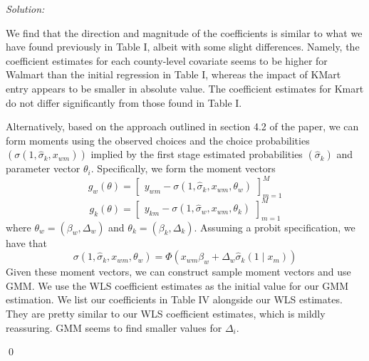 \documentclass[12pt]{article}
\newenvironment{sol}
    {\emph{Solution:}
    }
    {
    \qed
    }
\begin{document}
\begin{sol}
  We find that the direction and magnitude of the coefficients is similar to what we have found previously in Table I, albeit with some slight differences. Namely, the coefficient estimates for each county-level covariate seems to be higher for Walmart than the initial regression in Table I, whereas the impact of KMart entry appears to be smaller in absolute value. The coefficient estimates for Kmart do not differ significantly from those found in Table I.


  Alternatively, based on the approach outlined in section 4.2 of the paper, we can form moments using the observed choices and the choice probabilities $(\sigma(1, \hat{\sigma}_k, x_{wm}))$ implied by the first stage estimated probabilities $(\hat{\sigma}_k)$ and parameter vector $\theta_i$. Specifically, we form the moment vectors
  \[g_w(\theta) = \begin{bmatrix} y_{wm} - \sigma(1, \hat{\sigma}_k, x_{wm}, \theta_w) \end{bmatrix}_{m=1}^M \]
  \[g_k(\theta) = \begin{bmatrix} y_{km} - \sigma(1, \hat{\sigma}_w, x_{wm}, \theta_k) \end{bmatrix}_{m=1}^M \]
  where $\theta_w = (\beta_w, \Delta_w)$ and $\theta_k = (\beta_k, \Delta_k)$. Assuming a probit specification, we have that 
  \[ \sigma(1, \hat{\sigma}_k, x_{wm}, \theta_w) = \Phi(x_{wm}\beta_w + \Delta_w \hat{\sigma}_k(1 \mid x_{m}))\]
  Given these moment vectors, we can construct sample moment vectors and use GMM. We use the WLS coefficient estimates as the initial value for our GMM estimation. We list our coefficients in Table IV alongside our WLS estimates. They are pretty similar to our WLS coefficient estimates, which is mildly reassuring. GMM seems to find smaller values for $\Delta_i$.


\end{sol}
\end{document}

